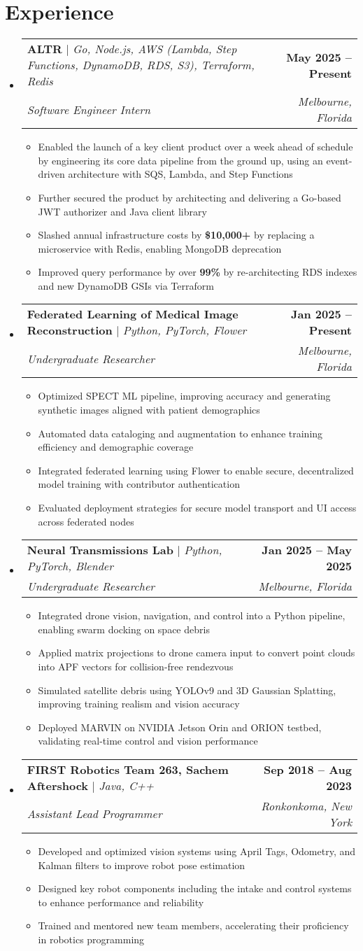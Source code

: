 \documentclass[letterpaper,11pt]{article}
\makeatletter
\newcommand{\resumeItem}[1]{
  \item\small{
    {#1 \vspace{-2pt}}
  }
}
\newcommand{\resumeSubheading}[4]{
  \vspace{-2pt}\item
    \begin{tabular*}{1.0\textwidth}[t]{l@{\extracolsep{\fill}}r}
      \small#1 & \textbf{\small #2} \\
      \textit{\small#3} & \textit{\small #4} \\
    \end{tabular*}\vspace{-9pt}
}
\newcommand{\resumeSubHeadingListStart}{\begin{itemize}[leftmargin=0.0in, label={}]}
\newcommand{\resumeSubHeadingListEnd}{\end{itemize}}
\newcommand{\resumeItemListStart}{\begin{itemize}}
\newcommand{\resumeItemListEnd}{\end{itemize}\vspace{-5pt}}
\makeatother
\begin{document}
\section{Experience}
  \resumeSubHeadingListStart
    \vspace{0pt}
    \resumeSubheading
    {\textbf{ALTR} $|$ \emph{Go, Node.js, AWS (Lambda, Step Functions, DynamoDB, RDS, S3), Terraform, Redis}}{May 2025 -- Present}
    {Software Engineer Intern}{Melbourne, Florida}
    \resumeItemListStart
      \resumeItem{Enabled the launch of a key client product over a week ahead of schedule by engineering its core data pipeline from the ground up, using an event-driven architecture with SQS, Lambda, and Step Functions}
      \resumeItem{Further secured the product by architecting and delivering a Go-based JWT authorizer and Java client library}
      \resumeItem{Slashed annual infrastructure costs by \textbf{\$10,000+} by replacing a microservice with Redis, enabling MongoDB deprecation}
      \resumeItem{Improved query performance by over \textbf{99\%} by re-architecting RDS indexes and new DynamoDB GSIs via Terraform}
    \resumeItemListEnd
  \resumeSubheading
    {\textbf{Federated Learning of Medical Image Reconstruction} $|$ \emph{Python, PyTorch, Flower}}{Jan 2025 -- Present}
    {Undergraduate Researcher}{Melbourne, Florida}
    \resumeItemListStart
      \resumeItem{Optimized SPECT ML pipeline, improving accuracy and generating synthetic images aligned with patient demographics}
      \resumeItem{Automated data cataloging and augmentation to enhance training efficiency and demographic coverage}
      \resumeItem{Integrated federated learning using Flower to enable secure, decentralized model training with contributor authentication}
      \resumeItem{Evaluated deployment strategies for secure model transport and UI access across federated nodes}
    \resumeItemListEnd
  \resumeSubheading
    {\textbf{Neural Transmissions Lab} $|$ \emph{Python, PyTorch, Blender}}{Jan 2025 -- May 2025}      
    {Undergraduate Researcher}{Melbourne, Florida}
    \resumeItemListStart
      \resumeItem{Integrated drone vision, navigation, and control into a Python pipeline, enabling swarm docking on space debris}
      \resumeItem{Applied matrix projections to drone camera input to convert point clouds into APF vectors for collision-free rendezvous}
      \resumeItem{Simulated satellite debris using YOLOv9 and 3D Gaussian Splatting, improving training realism and vision accuracy}
      \resumeItem{Deployed MARVIN on NVIDIA Jetson Orin and ORION testbed, validating real-time control and vision performance}
    \resumeItemListEnd
  \resumeSubheading
    {\textbf{FIRST Robotics Team 263, Sachem Aftershock} $|$ \emph{Java, C++}}{Sep 2018 -- Aug 2023}
    {Assistant Lead Programmer}{Ronkonkoma, New York}
    \resumeItemListStart
      \resumeItem{Developed and optimized vision systems using April Tags, Odometry, and Kalman filters to improve robot pose estimation}
      \resumeItem{Designed key robot components including the intake and control systems to enhance performance and reliability}
      \resumeItem{Trained and mentored new team members, accelerating their proficiency in robotics programming}
    \resumeItemListEnd
\resumeSubHeadingListEnd
\end{document}
